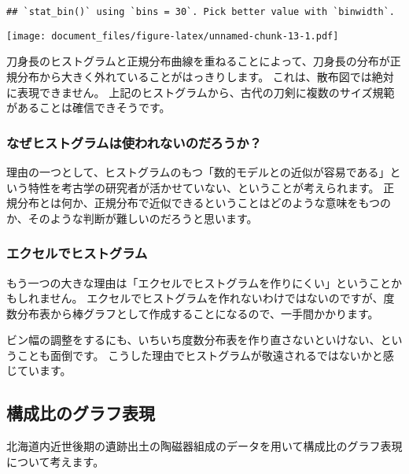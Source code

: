 \documentclass[]{article}
\newenvironment{Shaded}{\begin{snugshade}}{\end{snugshade}}
\newcommand{\CommentTok}[1]{\textcolor[rgb]{0.56,0.35,0.01}{\textit{#1}}}
\newcommand{\DataTypeTok}[1]{\textcolor[rgb]{0.13,0.29,0.53}{#1}}
\newcommand{\KeywordTok}[1]{\textcolor[rgb]{0.13,0.29,0.53}{\textbf{#1}}}
\newcommand{\NormalTok}[1]{#1}
\newcommand{\OperatorTok}[1]{\textcolor[rgb]{0.81,0.36,0.00}{\textbf{#1}}}
\newcommand{\StringTok}[1]{\textcolor[rgb]{0.31,0.60,0.02}{#1}}
\begin{document}
\begin{verbatim}
## `stat_bin()` using `bins = 30`. Pick better value with `binwidth`.
\end{verbatim}

\texttt{[image: document\_files/figure-latex/unnamed-chunk-13-1.pdf]}

刀身長のヒストグラムと正規分布曲線を重ねることによって、刀身長の分布が正規分布から大きく外れていることがはっきりします。
これは、散布図では絶対に表現できません。
上記のヒストグラムから、古代の刀剣に複数のサイズ規範があることは確信できそうです。

\subsubsection{なぜヒストグラムは使われないのだろうか？}

理由の一つとして、ヒストグラムのもつ「数的モデルとの近似が容易である」という特性を考古学の研究者が活かせていない、ということが考えられます。
正規分布とは何か、正規分布で近似できるということはどのような意味をもつのか、そのような判断が難しいのだろうと思います。

\subsubsection{エクセルでヒストグラム}

もう一つの大きな理由は「エクセルでヒストグラムを作りにくい」ということかもしれません。
エクセルでヒストグラムを作れないわけではないのですが、度数分布表から棒グラフとして作成することになるので、一手間かかります。

ビン幅の調整をするにも、いちいち度数分布表を作り直さないといけない、ということも面倒です。
こうした理由でヒストグラムが敬遠されるではないかと感じています。

\subsection{構成比のグラフ表現}

北海道内近世後期の遺跡出土の陶磁器組成のデータを用いて構成比のグラフ表現について考えます。

\begin{Shaded}
\end{Shaded}
\end{document}
